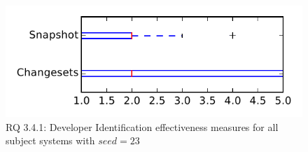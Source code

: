 
\begin{figure}
\centering
\includegraphics[height=0.4\textheight]{figures/dit_seed/rq1_tiny_23}
\caption{RQ 3.4.1: Developer Identification effectiveness measures for all subject systems with $seed=23$}
\label{fig:dit_seed:rq1:tiny}
\end{figure}
